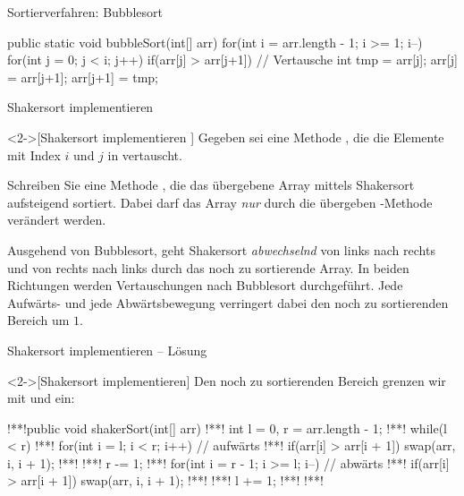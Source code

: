\begin{frame}[fragile,c]{Sortierverfahren: Bubblesort}
    \begin{plainjava}
public static void bubbleSort(int[] arr) {
    for(int i = arr.length - 1; i >= 1; i--) {
        for(int j = 0; j < i; j++) {
            if(arr[j] > arr[j+1]) { // Vertausche
                int tmp = arr[j];
                arr[j] = arr[j+1];
                arr[j+1] = tmp;
            }
        }
    }
}
    \end{plainjava}
\end{frame}


\ifull
\begin{frame}[c]{Shakersort implementieren}
    \begin{exercise}<2->[Shakersort implementieren ]
        \pause{}Gegeben sei eine Methode , die die Elemente mit Index \(i\) und \(j\) in  vertauscht.\medskip\par\pause Schreiben Sie eine Methode , die das übergebene Array mittels Shakersort aufsteigend sortiert. Dabei darf das Array \emph{nur} durch die übergeben -Methode verändert werden.\medskip\par
        Ausgehend von Bubblesort, geht Shakersort \textit{abwechselnd} von links nach rechts und von rechts nach links durch das noch zu sortierende Array. In beiden Richtungen werden Vertauschungen nach Bubblesort durchgeführt.
        Jede Aufwärts- und jede Abwärtsbewegung verringert dabei den noch zu sortierenden Bereich um \(1\).
    \end{exercise}
\end{frame}

\begin{frame}[fragile,c]{Shakersort implementieren -- Lösung}
    \begin{solve}<2->[Shakersort implementieren]
        \pause{}Den noch zu sortierenden Bereich grenzen wir mit  und  ein:
\begin{plainjava}
!**!public void shakerSort(int[] arr) {
!**!    int l = 0, r = arr.length - 1;
!**!    while(l < r) {
!**!        for(int i = l; i < r; i++) { // aufwärts
!**!            if(arr[i] > arr[i + 1]) swap(arr, i, i + 1);
!**!        }
!**!        r -= 1;
!**!        for(int i = r - 1; i >= l; i--) { // abwärts
!**!            if(arr[i] > arr[i + 1]) swap(arr, i, i + 1);
!**!        }
!**!        l += 1;
!**!    }
!**!}
    \end{plainjava}
    \end{solve}
\end{frame}

